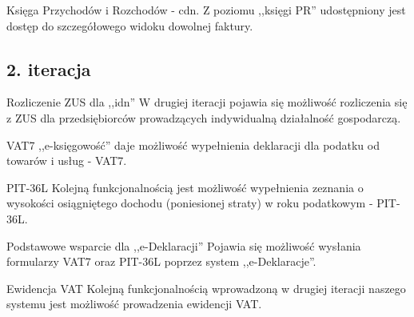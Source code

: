 \documentclass{beamer}
\begin{document}
  \begin{frame}
    \begin{block}{Księga Przychodów i Rozchodów - cdn.}
      Z poziomu ,,księgi PR'' udostępniony jest dostęp do szczegółowego widoku dowolnej faktury.
    \end{block}
  \end{frame}
\subsection{2. iteracja}
  \begin{frame}
    \begin{block}{Rozliczenie ZUS dla ,,idn''}
      W drugiej iteracji pojawia się możliwość rozliczenia się z ZUS dla przedsiębiorców prowadzących indywidualną działalność gospodarczą.
    \end{block}
  \end{frame}
  \begin{frame}
    \begin{block}{VAT7}
      ,,e-księgowość'' daje możliwość wypełnienia deklaracji dla podatku od towarów i usług - VAT7.
    \end{block}
  \end{frame}
  \begin{frame}
    \begin{block}{PIT-36L}
      Kolejną funkcjonalnością jest możliwość wypełnienia zeznania o wysokości osiągniętego dochodu (poniesionej straty) w roku podatkowym - PIT-36L.
    \end{block}
  \end{frame}
  \begin{frame}
    \begin{block}{Podstawowe wsparcie dla ,,e-Deklaracji''}
      Pojawia się możliwość wysłania formularzy VAT7 oraz PIT-36L poprzez system ,,e-Deklaracje''.
    \end{block}
  \end{frame}
  \begin{frame}
    \begin{block}{Ewidencja VAT}
      Kolejną funkcjonalnością wprowadzoną w drugiej iteracji naszego systemu jest możliwość prowadzenia ewidencji VAT.
    \end{block}
  \end{frame}
\end{document}
